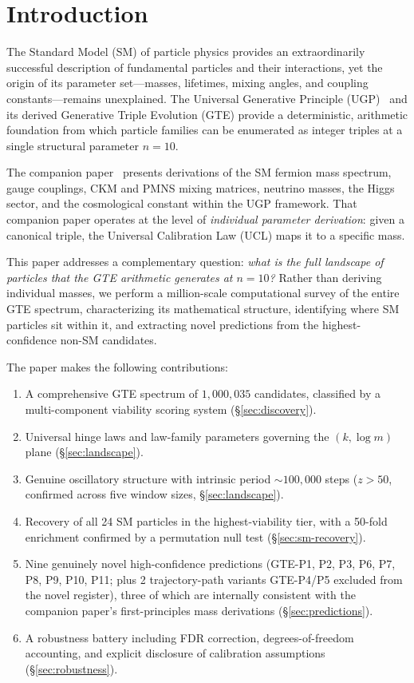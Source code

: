 \documentclass[12pt]{article}
\numberwithin{equation}{section}
\begin{document}
\section{Introduction}
\label{sec:intro}

The Standard Model (SM) of particle physics provides an extraordinarily successful description of fundamental particles and their interactions, yet the origin of its parameter set---masses, lifetimes, mixing angles, and coupling constants---remains unexplained. The Universal Generative Principle (UGP)~\cite{SpivackUGPFormalization,ugp-lean} and its derived Generative Triple Evolution (GTE) provide a deterministic, arithmetic foundation from which particle families can be enumerated as integer triples at a single structural parameter $n{=}10$.

The companion paper~\cite{SpivackSM} presents derivations of the SM fermion mass spectrum, gauge couplings, CKM and PMNS mixing matrices, neutrino masses, the Higgs sector, and the cosmological constant within the UGP framework. That companion paper operates at the level of \emph{individual parameter derivation}: given a canonical triple, the Universal Calibration Law (UCL) maps it to a specific mass.

This paper addresses a complementary question: \emph{what is the full landscape of particles that the GTE arithmetic generates at $n{=}10$?} Rather than deriving individual masses, we perform a million-scale computational survey of the entire GTE spectrum, characterizing its mathematical structure, identifying where SM particles sit within it, and extracting novel predictions from the highest-confidence non-SM candidates.

The paper makes the following contributions:
\begin{enumerate}[label=(\roman*)]
\item A comprehensive GTE spectrum of $1{,}000{,}035$ candidates, classified by a multi-component viability scoring system (\S\ref{sec:discovery}).
\item Universal hinge laws and law-family parameters governing the $(k, \log m)$ plane (\S\ref{sec:landscape}).
\item Genuine oscillatory structure with intrinsic period ${\sim}100{,}000$ steps ($z > 50$, confirmed across five window sizes, \S\ref{sec:landscape}).
\item Recovery of all 24 SM particles in the highest-viability tier, with a 50-fold enrichment confirmed by a permutation null test (\S\ref{sec:sm-recovery}).
\item Nine genuinely novel high-confidence predictions (GTE-P1, P2, P3, P6, P7, P8, P9, P10, P11; plus 2 trajectory-path variants GTE-P4/P5 excluded from the novel register), three of which are internally consistent with the companion paper's first-principles mass derivations (\S\ref{sec:predictions}).
\item A robustness battery including FDR correction, degrees-of-freedom accounting, and explicit disclosure of calibration assumptions (\S\ref{sec:robustness}).
\end{enumerate}
\end{document}
